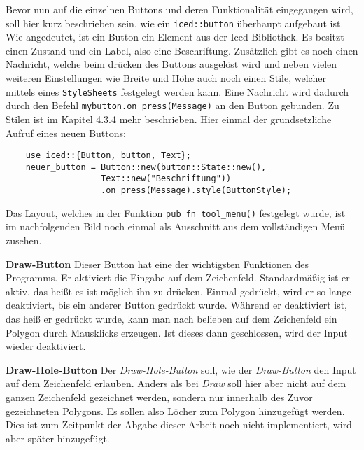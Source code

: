 Bevor nun auf die einzelnen Buttons und deren Funktionalität eingegangen wird, soll hier kurz beschrieben sein, wie ein \lstinline{iced::button} überhaupt aufgebaut ist. 
Wie angedeutet, ist ein Button ein Element aus der Iced-Bibliothek. Es besitzt einen Zustand und ein Label, also eine Beschriftung. Zusätzlich gibt es noch einen Nachricht, welche beim drücken des Buttons ausgelöst wird und neben vielen weiteren Einstellungen wie Breite und Höhe auch noch einen 
Stile, welcher mittels eines \lstinline{StyleSheets} festgelegt werden kann. Eine Nachricht wird dadurch durch den Befehl \lstinline{mybutton.on_press(Message)} an den Button gebunden. 
Zu Stilen ist im Kapitel 4.3.4 mehr beschrieben. Hier einmal der grundsetzliche Aufruf eines neuen Buttons:


\begin{lstlisting}
    use iced::{Button, button, Text};
    neuer_button = Button::new(button::State::new(), 
                   Text::new("Beschriftung"))
                   .on_press(Message).style(ButtonStyle);
\end{lstlisting}

Das Layout, welches in der Funktion \lstinline{pub fn tool_menu()} festgelegt wurde, ist im nachfolgenden Bild noch einmal als Ausschnitt aus dem vollständigen Menü zusehen.
\linebreak

\textbf{\small{Draw-Button}}\linebreak
Dieser Button hat eine der wichtigsten Funktionen des Programms. Er aktiviert die Eingabe auf dem Zeichenfeld. Standardmäßig ist er aktiv, das heißt es ist möglich ihn zu drücken. Einmal gedrückt, wird er so lange 
deaktiviert, bis ein anderer Button gedrückt wurde. Während er deaktiviert ist, das heiß er gedrückt wurde, kann man nach belieben auf dem Zeichenfeld ein Polygon durch Mausklicks erzeugen. Ist dieses dann geschlossen, wird der 
Input wieder deaktiviert.\linebreak

\textbf{\small{Draw-Hole-Button}}\linebreak
Der \emph{Draw-Hole-Button} soll, wie der \emph{Draw-Button} den Input auf dem Zeichenfeld erlauben. Anders als bei \emph{Draw} soll hier aber nicht auf dem ganzen Zeichenfeld
gezeichnet werden, sondern nur innerhalb des Zuvor gezeichneten Polygons. Es sollen also Löcher zum Polygon hinzugefügt werden. Dies ist zum Zeitpunkt der Abgabe dieser Arbeit noch nicht implementiert, wird aber später hinzugefügt.
\linebreak


